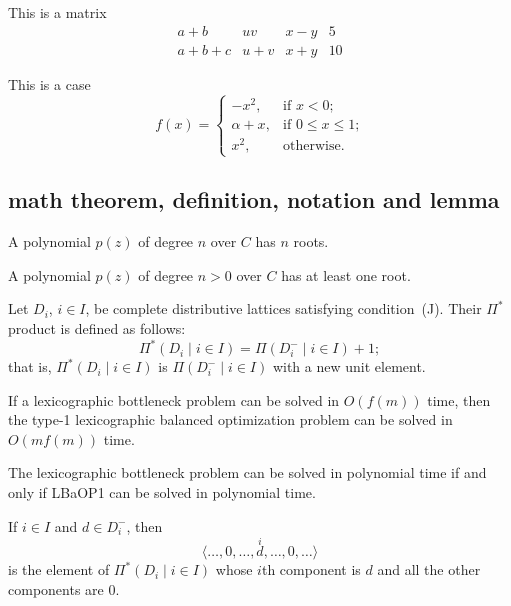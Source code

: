 This is a matrix
\[
\begin{matrix}
    a+b & uv & x-y & 5\\
    a+b+c & u+v &x+y & 10
\end{matrix}
\]

This is a case
\[
f(x)=
\begin{cases}
    -x^{2}, &\text{if $x<0$;}\\
    \alpha+x, &\text{if $0 \leq x \leq 1$;}\\
    x^{2}, &\text{otherwise.}
\end{cases}
\]

\subsection{math theorem, definition, notation and lemma}
\begin{theorem} A polynomial $p(z)$ of degree $n$ over $C$ has $n$ roots.
\end{theorem}

\begin{lemma} A polynomial $p(z)$ of degree $n>0$ over $C$ has at least
one root.
\end{lemma}

\begin{definition}
   Let $D_{i}$, $i \in I$, be complete distributive
   lattices satisfying condition~\textup{(J)}.  Their
   $\Pi^{*}$ product is defined as follows:
   \[
      \Pi^{*} ( D_{i} \mid i \in I ) =
       \Pi ( D_{i}^{-} \mid i \in I ) + 1;
   \]
   that is, $\Pi^{*} ( D_{i} \mid i \in I )$ is
   $\Pi ( D_{i}^{-} \mid i \in I )$ with a new unit element.
\end{definition}

\begin{theorem}
If a lexicographic bottleneck problem can be solved in $O(f(m))$
time, then the type-1 lexicographic balanced optimization problem
can be solved in $O(mf(m))$ time.
\end{theorem}

\begin{theorem}The lexicographic bottleneck problem can be
solved in polynomial time if and only if LBaOP1 can be solved in
polynomial time.
\end{theorem}

\begin{notation}
   If $i \in I$ and $d \in D_{i}^{-}$, then
   \[
      \langle \dots, 0, \dots, \overset{i}{d}, \dots, 0,
       \dots \rangle
   \]
   is the element of $\Pi^{*} ( D_{i} \mid i \in I )$ whose
   $i$th component is $d$ and all the other components
   are $0$.
\end{notation}
